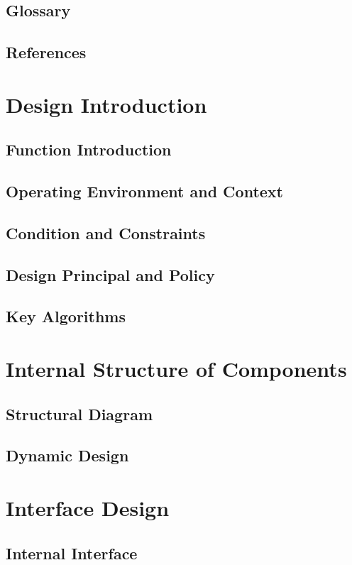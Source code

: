 \documentclass[11pt,letterpaper]{report}
\begin{document}
\section{Glossary}
\section{References}

\chapter{Design Introduction}
\section{Function Introduction}
\section{Operating Environment and Context}
\section{Condition and Constraints}
\section{Design Principal and Policy}
\section{Key Algorithms}

\chapter{Internal Structure of Components}
\section{Structural Diagram}
\section{Dynamic Design}


\chapter{Interface Design}
\section{Internal Interface}
\end{document}
